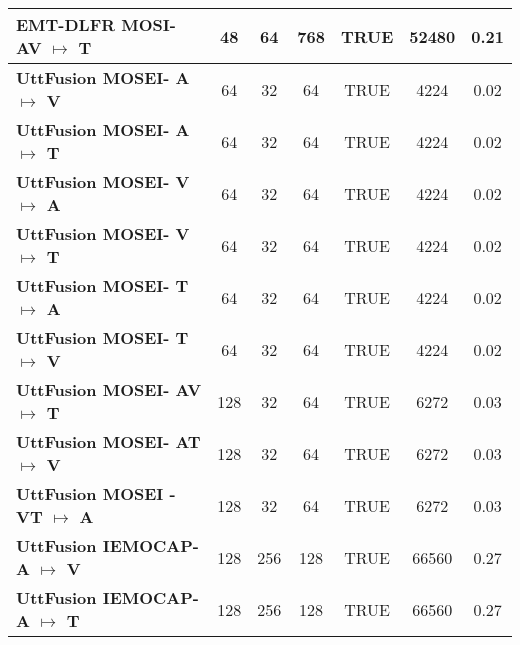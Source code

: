 \begin{table}[]
{\begin{tabular}{l|cccccc}
\textbf{EMT-DLFR MOSI- AV $\mapsto$ T}         & 48                  & 64                   & 768                  & TRUE                & 52480                     & 0.21               \\ \hline
\textbf{UttFusion MOSEI- A $\mapsto$ V}        & 64                  & 32                   & 64                   & TRUE                & 4224                      & 0.02               \\
\textbf{UttFusion MOSEI- A $\mapsto$ T}        & 64                  & 32                   & 64                   & TRUE                & 4224                      & 0.02               \\
\textbf{UttFusion MOSEI- V $\mapsto$ A}        & 64                  & 32                   & 64                   & TRUE                & 4224                      & 0.02               \\
\textbf{UttFusion MOSEI- V $\mapsto$ T}        & 64                  & 32                   & 64                   & TRUE                & 4224                      & 0.02               \\
\textbf{UttFusion MOSEI- T $\mapsto$ A}        & 64                  & 32                   & 64                   & TRUE                & 4224                      & 0.02               \\
\textbf{UttFusion MOSEI- T $\mapsto$ V}        & 64                  & 32                   & 64                   & TRUE                & 4224                      & 0.02               \\
\textbf{UttFusion MOSEI- AV $\mapsto$ T}       & 128                 & 32                   & 64                   & TRUE                & 6272                      & 0.03               \\
\textbf{UttFusion MOSEI- AT $\mapsto$ V}       & 128                 & 32                   & 64                   & TRUE                & 6272                      & 0.03               \\
\textbf{UttFusion MOSEI - VT $\mapsto$ A}      & 128                 & 32                   & 64                   & TRUE                & 6272                      & 0.03               \\
\textbf{UttFusion IEMOCAP- A $\mapsto$ V}      & 128                 & 256                  & 128                  & TRUE                & 66560                     & 0.27               \\
\textbf{UttFusion IEMOCAP- A $\mapsto$ T}      & 128                 & 256                  & 128                  & TRUE                & 66560                     & 0.27               \\

\end{tabular}}
\end{table}
